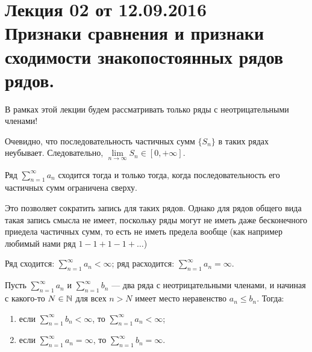 \documentclass[a4paper, 12pt]{article}
\begin{document}
\pagestyle{fancy}
\section{Лекция 02 от 12.09.2016 \\Признаки сравнения и признаки сходимости знакопостоянных рядов рядов.}

В рамках этой лекции будем рассматривать только ряды с неотрицательными членами!

Очевидно, что последовательность частичных сумм $\{S_n \}$ в таких рядах неубывает. Следовательно, $\lim\limits_{n\rightarrow \infty}S_n \in [0, +\infty]$.

\begin{Statement}
	Ряд $\sum\limits_{n=1}^{\infty} a_n$ сходится тогда и только тогда, когда последовательность его частичных сумм ограничена сверху.
\end{Statement}

Это позволяет сократить запись для таких рядов. Однако для рядов общего вида такая запись смысла не имеет, поскольку ряды могут не иметь даже бесконечного приедела частичных сумм, то есть не иметь предела вообще (как например любимый нами ряд $1 - 1 + 1 - 1 + \ldots$)
\begin{Designation} Ряд сходится: $\sum\limits_{n=1}^{\infty} a_n < \infty$; ряд расходится: $\sum\limits_{n=1}^{\infty} a_n = \infty$.
\end{Designation}

\begin{Test}
	Пусть $\sum\limits_{n=1}^{\infty} a_n$ и $\sum\limits_{n=1}^{\infty} b_n$ --- два ряда с неотрицательными членами, и начиная с какого-то $N\in \mathbb{N}$ для всех $n > N$ имеет место неравенство $a_n \le b_n$. Тогда:
	\begin{enumerate}
	\item если $\sum\limits_{n=1}^{\infty} b_n < \infty$, то $\sum\limits_{n=1}^{\infty} a_n < \infty$;
	\item если $\sum\limits_{n=1}^{\infty} a_n = \infty$, то $\sum\limits_{n=1}^{\infty} b_n = \infty$.
	\end{enumerate}
\end{Test}
\end{document}
